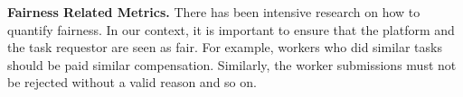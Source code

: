 \textbf{Fairness Related Metrics.}
There has been intensive research on how to quantify fairness.
In our context, it is important to ensure that the platform and the task requestor are seen as fair.
For example, workers who did similar tasks should be paid similar compensation.
Similarly, the worker submissions must not be rejected without a valid reason and so on.
